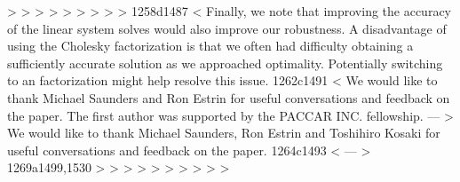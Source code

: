 > 
> \fi
> 
> 
> 
> 
> 
> 
> %
1258d1487
< Finally, we note that improving the accuracy of the linear system solves would also improve our robustness. A disadvantage of using the Cholesky factorization is that we often had difficulty obtaining a sufficiently accurate solution as we approached optimality. Potentially switching to an \LBL{} factorization \cite{amestoy1998mumps,bunch1971direct} might help resolve this issue.
1262c1491
< We would like to thank Michael Saunders and Ron Estrin for useful conversations and feedback on the paper. The first author was supported by the PACCAR INC. fellowship.
---
> We would like to thank Michael Saunders, Ron Estrin and Toshihiro Kosaki for useful conversations and feedback on the paper.
1264c1493
<  %
---
>  %
1269a1499,1530
> %
> %
> %
> %
> %
> %
> %
> %
> %
> %
